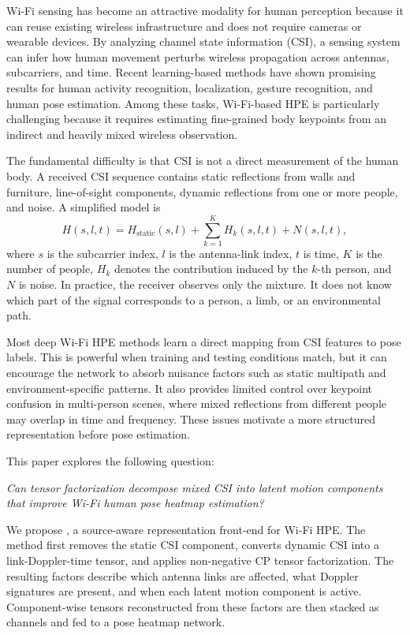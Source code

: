 \documentclass[10pt,journal]{IEEEtran}
\newcommand{\method}{\mathtt{DePose\mbox{-}Fi}}
\begin{document}
Wi-Fi sensing has become an attractive modality for human perception because it can reuse existing wireless infrastructure and does not require cameras or wearable devices. By analyzing channel state information (CSI), a sensing system can infer how human movement perturbs wireless propagation across antennas, subcarriers, and time. Recent learning-based methods have shown promising results for human activity recognition, localization, gesture recognition, and human pose estimation. Among these tasks, Wi-Fi-based HPE is particularly challenging because it requires estimating fine-grained body keypoints from an indirect and heavily mixed wireless observation.

The fundamental difficulty is that CSI is not a direct measurement of the human body. A received CSI sequence contains static reflections from walls and furniture, line-of-sight components, dynamic reflections from one or more people, and noise. A simplified model is
\begin{equation}
    H(s,l,t)
    =
    H_{\mathrm{static}}(s,l)
    +
    \sum_{k=1}^{K}H_k(s,l,t)
    +
    N(s,l,t),
    \label{eq:csi_mixture}
\end{equation}
where $s$ is the subcarrier index, $l$ is the antenna-link index, $t$ is time, $K$ is the number of people, $H_k$ denotes the contribution induced by the $k$-th person, and $N$ is noise. In practice, the receiver observes only the mixture. It does not know which part of the signal corresponds to a person, a limb, or an environmental path.

Most deep Wi-Fi HPE methods learn a direct mapping from CSI features to pose labels. This is powerful when training and testing conditions match, but it can encourage the network to absorb nuisance factors such as static multipath and environment-specific patterns. It also provides limited control over keypoint confusion in multi-person scenes, where mixed reflections from different people may overlap in time and frequency. These issues motivate a more structured representation before pose estimation.

This paper explores the following question:

\emph{Can tensor factorization decompose mixed CSI into latent motion components that improve Wi-Fi human pose heatmap estimation?}

We propose \method, a source-aware representation front-end for Wi-Fi HPE. The method first removes the static CSI component, converts dynamic CSI into a link-Doppler-time tensor, and applies non-negative CP tensor factorization. The resulting factors describe which antenna links are affected, what Doppler signatures are present, and when each latent motion component is active. Component-wise tensors reconstructed from these factors are then stacked as channels and fed to a pose heatmap network.
\end{document}
